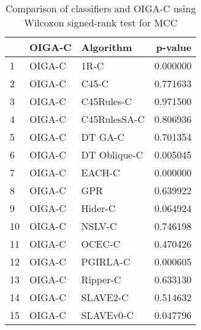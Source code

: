 \begin{table}
\footnotesize
\caption{Comparison of classifiers and OIGA-C using Wilcoxon signed-rank test for MCC}
\label{tab:OIGA-C wilcoxon MCC comparison}
\begin{tabular}{lllr}
\hline
 & OIGA-C & Algorithm & p-value \\
\hline
1 & OIGA-C & 1R-C & 0.000000 \\
2 & OIGA-C & C45-C & 0.771633 \\
3 & OIGA-C & C45Rules-C & 0.971500 \\
4 & OIGA-C & C45RulesSA-C & 0.806936 \\
5 & OIGA-C & DT GA-C & 0.701354 \\
6 & OIGA-C & DT Oblique-C & 0.005045 \\
7 & OIGA-C & EACH-C & 0.000000 \\
8 & OIGA-C & GPR & 0.639922 \\
9 & OIGA-C & Hider-C & 0.064924 \\
10 & OIGA-C & NSLV-C & 0.746198 \\
11 & OIGA-C & OCEC-C & 0.470426 \\
12 & OIGA-C & PGIRLA-C & 0.000605 \\
13 & OIGA-C & Ripper-C & 0.633130 \\
14 & OIGA-C & SLAVE2-C & 0.514632 \\
15 & OIGA-C & SLAVEv0-C & 0.047796 \\
\hline
\end{tabular}
\end{table}
